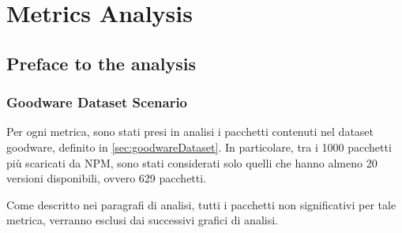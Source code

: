 \chapter{Metrics Analysis}
\label{ch:metricsAnalysis}
\setcounter{section}{-1} %

\section{Preface to the analysis}
\label{sec:prefaceAnalysis}

\subsection{Goodware Dataset Scenario}

Per ogni metrica, sono stati presi in analisi i pacchetti contenuti nel dataset goodware, definito in \cref{sec:goodwareDataset}. 
In particolare, tra i 1000 pacchetti più scaricati da NPM, sono stati considerati solo quelli che hanno almeno 20 versioni disponibili,
ovvero 629 pacchetti.

Come descritto nei paragrafi di analisi, tutti i pacchetti non significativi per tale metrica, 
verranno esclusi dai successivi grafici di analisi.

